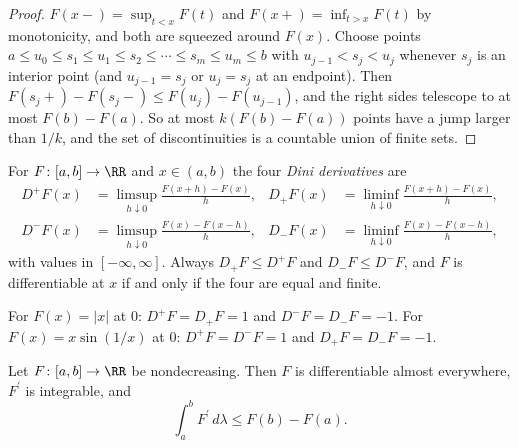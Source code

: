 \begin{proof}
$F(x-) = \sup_{t < x}F(t)$ and $F(x+) = \inf_{t > x}F(t)$ by monotonicity, and both are squeezed around $F(x)$. Choose points $a \leq u_0 \leq s_1 \leq u_1 \leq s_2 \leq \cdots \leq s_m \leq u_m \leq b$ with
$u_{j-1} < s_j < u_j$ whenever $s_j$ is an interior point (and $u_{j-1} = s_j$ or $u_j = s_j$ at an endpoint). Then $F(s_j+) - F(s_j-) \leq F(u_j) - F(u_{j-1})$, and the right sides telescope to at most
$F(b) - F(a)$. So at most $k(F(b) - F(a))$ points have a jump larger than $1/k$, and the set of discontinuities is a countable union of finite sets.
\end{proof}

\begin{definition}\label{lebesgue-differentiation:definition-dini}
For $F \colon [a, b] \to \RR$ and $x \in (a, b)$ the four \emph{Dini derivatives} are
\[\begin{aligned}
D^+F(x) &= \limsup_{h \downarrow 0}\frac{F(x + h) - F(x)}{h}, & D_+F(x) &= \liminf_{h \downarrow 0}\frac{F(x + h) - F(x)}{h}, \\
D^-F(x) &= \limsup_{h \downarrow 0}\frac{F(x) - F(x - h)}{h}, & D_-F(x) &= \liminf_{h \downarrow 0}\frac{F(x) - F(x - h)}{h},
\end{aligned}\]
with values in $[-\infty, \infty]$. Always $D_+F \leq D^+F$ and $D_-F \leq D^-F$, and $F$ is differentiable at $x$ if and only if the four are equal and finite.
\end{definition}

For $F(x) = |x|$ at $0$: $D^+F = D_+F = 1$ and $D^-F = D_-F = -1$. For $F(x) = x\sin(1/x)$ at $0$: $D^+F = D^-F = 1$ and $D_+F = D_-F = -1$.

\begin{theorem}[Lebesgue]\label{lebesgue-differentiation:theorem-lebesgue-monotone}
Let $F \colon [a, b] \to \RR$ be nondecreasing. Then $F$ is differentiable almost everywhere, $F^{\prime}$ is integrable, and
\[
\int_a^bF^{\prime}\,d\lambda \leq F(b) - F(a).
\]
\end{theorem}

